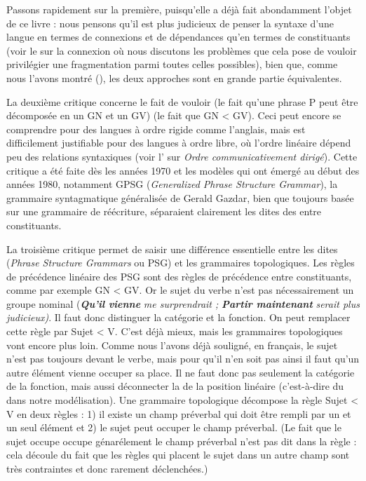 {    Passons rapidement sur la première, puisqu’elle a déjà fait abondamment l’objet de ce livre : nous pensons qu’il est plus judicieux de penser la syntaxe d’une langue en termes de connexions et de dépendances qu’en termes de constituants (voir le  sur la connexion où nous discutons les problèmes que cela pose de vouloir privilégier une fragmentation parmi toutes celles possibles), bien que, comme nous l’avons montré (), les deux approches sont en grande partie équivalentes.

    La deuxième critique concerne le fait de vouloir  (le fait qu’une phrase P peut être décomposée en un GN et un GV)  (le fait que GN < GV). Ceci peut encore se comprendre pour des langues à ordre rigide comme l’anglais, mais est difficilement justifiable pour des langues à ordre libre, où l’ordre linéaire dépend peu des relations syntaxiques (voir l’ sur \textit{Ordre communicativement dirigé}). Cette critique a été faite dès les années 1970 et les modèles qui ont émergé au début des années 1980, notamment GPSG (\textit{Generalized Phrase Structure Grammar}), la grammaire syntagmatique généralisée de Gerald Gazdar, bien que toujours basée sur une grammaire de réécriture, séparaient clairement les dites des  entre constituants.

    La troisième critique permet de saisir une différence essentielle entre les  dites  (\textit{Phrase Structure Grammars} ou PSG) et les grammaires topologiques. Les règles de précédence linéaire des PSG sont des règles de précédence entre constituants, comme par exemple GN < GV. Or le sujet du verbe n’est pas nécessairement un groupe nominal (\textbf{\textit{Qu’il} \textit{vienne}} \textit{me surprendrait ;} \textbf{\textit{Partir maintenant}} \textit{serait plus judicieux)}. Il faut donc distinguer la catégorie et la fonction. On peut remplacer cette règle par Sujet < V. C’est déjà mieux, mais les grammaires topologiques vont encore plus loin. Comme nous l’avons déjà souligné, en français, le sujet n’est pas toujours devant le verbe, mais pour qu’il n’en soit pas ainsi il faut qu’un autre élément vienne occuper sa place. Il ne faut donc pas seulement  la catégorie de la fonction, mais aussi déconnecter la  de la position linéaire (c'est-à-dire du  dans notre modélisation). Une grammaire topologique décompose la règle Sujet < V en deux règles : 1) il existe un champ préverbal qui doit être rempli par un et un seul élément et 2) le sujet peut occuper le champ préverbal. (Le fait que le sujet occupe occupe génarélement le champ préverbal n'est pas dit dans la règle : cela découle du fait que les règles qui placent le sujet dans un autre champ sont très contraintes et donc rarement déclenchées.)
}
